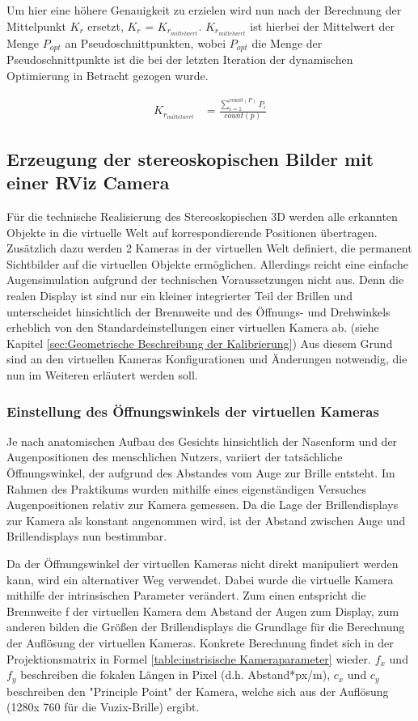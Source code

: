 Um hier eine höhere Genauigkeit zu erzielen wird nun nach der Berechnung der Mittelpunkt $K_r$ ersetzt, $K_r$ = $K_{r_{mittelwert}}$. $K_{r_{mittelwert}}$ ist hierbei der Mittelwert der Menge $P_{opt}$ an Pseudoschnittpunkten, wobei $P_{opt}$ die Menge der Pseudoschnittpunkte ist die bei der letzten Iteration der dynamischen Optimierung in Betracht gezogen wurde.


\begin{align}
K_{r_{mittelwert}} &= \frac{\sum\limits_{i=1}^{count(P)} P_i}{count(p)} 
\end{align}

\subsection{Erzeugung der stereoskopischen Bilder mit einer RViz Camera}
Für die technische Realisierung des Stereoskopischen 3D werden alle erkannten Objekte in die virtuelle Welt auf korrespondierende Positionen übertragen. 
Zusätzlich dazu werden 2 Kameras in der virtuellen Welt definiert, die permanent Sichtbilder auf die virtuellen Objekte ermöglichen. Allerdings reicht eine einfache Augensimulation aufgrund der technischen Voraussetzungen nicht aus. 
Denn die realen Display ist sind nur ein kleiner integrierter Teil der Brillen und unterscheidet hinsichtlich der Brennweite und des Öffnungs- und Drehwinkels erheblich von den Standardeinstellungen einer virtuellen Kamera ab. (siehe Kapitel \ref{sec:Geometrische Beschreibung der Kalibrierung})
Aus diesem Grund sind an den virtuellen Kameras Konfigurationen und Änderungen notwendig, die nun im Weiteren erläutert werden soll. 


\subsubsection{Einstellung des Öffnungswinkels der virtuellen Kameras}
\label{sec:virtuelle Kameras}

Je nach anatomischen Aufbau des Gesichts hinsichtlich  der Nasenform und der Augenpositionen des menschlichen Nutzers, variiert der tatsächliche Öffnungswinkel, der aufgrund des Abstandes vom Auge zur Brille entsteht. Im Rahmen des Praktikums wurden mithilfe eines eigenständigen Versuches Augenpositionen relativ zur Kamera gemessen. Da die Lage der Brillendisplays zur Kamera als konstant angenommen wird, ist der Abstand zwischen Auge und Brillendisplays nun bestimmbar.

Da der Öffnungswinkel der virtuellen Kameras nicht direkt manipuliert werden kann, wird ein alternativer Weg verwendet. Dabei wurde die virtuelle Kamera mithilfe der intrinsischen Parameter verändert. Zum einen entspricht die Brennweite f der virtuellen Kamera dem Abstand der Augen zum Display, zum anderen bilden die Größen der Brillendisplays die Grundlage für die Berechnung der Auflösung der virtuellen Kameras. Konkrete Berechnung findet sich in der Projektionsmatrix in Formel \ref{table:instrisische Kameraparameter} wieder. $f_x$ und $f_y$ beschreiben die fokalen Längen in Pixel (d.h. Abstand*px/m), $c_x$ und $c_y$ beschreiben den "Principle Point" der Kamera, welche sich aus der Auflösung (1280x 760 für die Vuzix-Brille) ergibt. 

